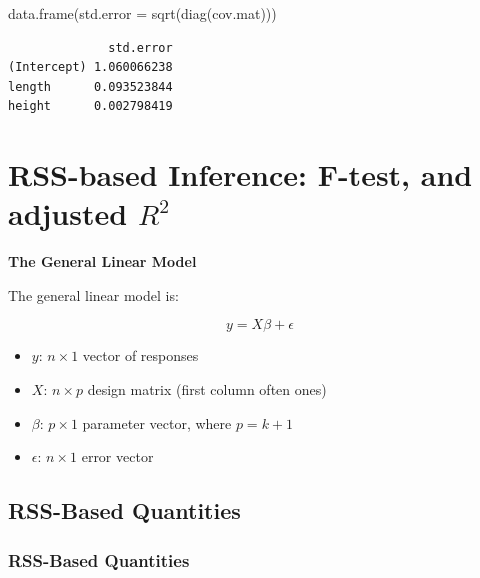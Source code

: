 \documentclass[
  letterpaper,
]{scrbook}
\newenvironment{Shaded}{\begin{snugshade}}{\end{snugshade}}
\newcommand{\AttributeTok}[1]{\textcolor[rgb]{0.40,0.45,0.13}{#1}}
\newcommand{\FunctionTok}[1]{\textcolor[rgb]{0.28,0.35,0.67}{#1}}
\newcommand{\NormalTok}[1]{\textcolor[rgb]{0.00,0.23,0.31}{#1}}
\providecommand{\tightlist}{%
  \setlength{\itemsep}{0pt}\setlength{\parskip}{0pt}}\usepackage{longtable,booktabs,array}
\begin{document}
\begin{Shaded}
\begin{Highlighting}[]
\FunctionTok{data.frame}\NormalTok{(}\AttributeTok{std.error =} \FunctionTok{sqrt}\NormalTok{(}\FunctionTok{diag}\NormalTok{(cov.mat)))}
\end{Highlighting}
\end{Shaded}

\begin{verbatim}
              std.error
(Intercept) 1.060066238
length      0.093523844
height      0.002798419
\end{verbatim}

\section{\texorpdfstring{RSS-based Inference: F-test, and adjusted
\(R^2\)}{RSS-based Inference: F-test, and adjusted R\^{}2}}\label{rss-based-inference-f-test-and-adjusted-r2}

\textbf{The General Linear Model}

The general linear model is:

\[y = X\beta + \epsilon\]

\begin{itemize}
\tightlist
\item
  \(y\): \(n \times 1\) vector of responses
\item
  \(X\): \(n \times p\) design matrix (first column often ones)
\item
  \(\beta\): \(p \times 1\) parameter vector, where \(p=k+1\)
\item
  \(\epsilon\): \(n \times 1\) error vector
\end{itemize}

\subsection{RSS-Based Quantities}\label{rss-based-quantities}

\subsubsection{RSS-Based Quantities}\label{rss-based-quantities-1}
\end{document}
